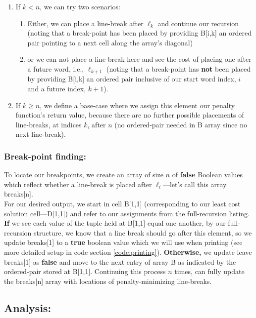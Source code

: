 \documentclass[conference]{styles/acmsiggraph}
\newcommand{\?}{\stackrel{?}{=}}
\begin{document}
\begin{enumerate}
    \item If $k < n$, we can try two scenarios: \begin{enumerate}
        \item Either, we can place a line-break after $\ell_k$ and continue our recursion (noting that a break-point has been placed by providing B[i,k] an ordered pair pointing to a next cell along the array's diagonal)
        \item or we can not place a line-break here and see the cost of placing one after a future word, i.e., $\ell_{k+1}$ (noting that a break-point has \textbf{not} been placed by providing B[i,k] an ordered pair inclusive of our start word index, $i$ and a future index, $k+1$).
    \end{enumerate}
    \item If $k \geq n$, we define a base-case where we assign this element our penalty function's return value, because there are no further possible placements of line-breaks, at indices $k$, after $n$ (no ordered-pair needed in B array since no next line-break).
\end{enumerate}

\subsubsection{Break-point finding:} \label{breakFind}
To locate our breakpoints, we create an array of size $n$ of \textbf{false} Boolean values which reflect whether a line-break is placed after $\ell_i$---let's call this array breaks[n].\\

For our desired output, we start in cell B[1,1] (corresponding to our least cost solution cell---D[1,1]) and refer to our assignments from the full-recursion listing.  \textbf{If} we see each value of the tuple held at B[1,1] equal one another, by our full-recursion structure, we know that a line break should go after this element, so we update breaks[1] to a \textbf{true} boolean value which we will use when printing (see more detailed setup in code section \ref{code:printing}).  \textbf{Otherwise,} we update leave breaks[1] as \textbf{false} and move to the next entry of array B as indicated by the ordered-pair stored at B[1,1].  Continuing this process $n$ times, can fully update the breaks[n] array with locations of penalty-minimizing line-breaks.
    
\subsection{Analysis:}
\end{document}
